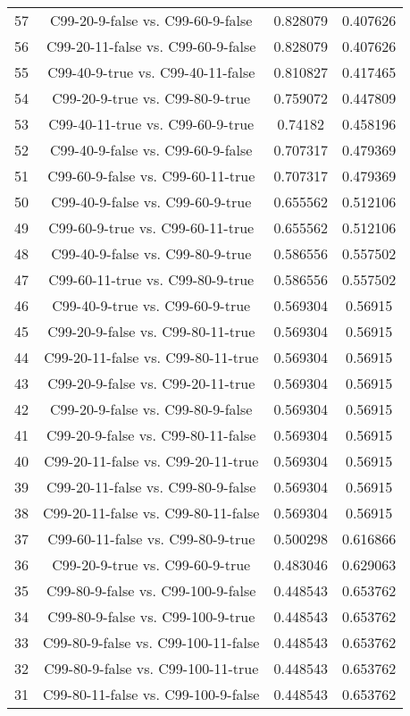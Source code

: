\documentclass[a4paper,10pt]{article}
\begin{document}
\begin{landscape}
\begin{table}[!htp]
\begin{tabular}{cccc}
57&C99-20-9-false vs. C99-60-9-false&0.828079&0.407626\\
56&C99-20-11-false vs. C99-60-9-false&0.828079&0.407626\\
55&C99-40-9-true vs. C99-40-11-false&0.810827&0.417465\\
54&C99-20-9-true vs. C99-80-9-true&0.759072&0.447809\\
53&C99-40-11-true vs. C99-60-9-true&0.74182&0.458196\\
52&C99-40-9-false vs. C99-60-9-false&0.707317&0.479369\\
51&C99-60-9-false vs. C99-60-11-true&0.707317&0.479369\\
50&C99-40-9-false vs. C99-60-9-true&0.655562&0.512106\\
49&C99-60-9-true vs. C99-60-11-true&0.655562&0.512106\\
48&C99-40-9-false vs. C99-80-9-true&0.586556&0.557502\\
47&C99-60-11-true vs. C99-80-9-true&0.586556&0.557502\\
46&C99-40-9-true vs. C99-60-9-true&0.569304&0.56915\\
45&C99-20-9-false vs. C99-80-11-true&0.569304&0.56915\\
44&C99-20-11-false vs. C99-80-11-true&0.569304&0.56915\\
43&C99-20-9-false vs. C99-20-11-true&0.569304&0.56915\\
42&C99-20-9-false vs. C99-80-9-false&0.569304&0.56915\\
41&C99-20-9-false vs. C99-80-11-false&0.569304&0.56915\\
40&C99-20-11-false vs. C99-20-11-true&0.569304&0.56915\\
39&C99-20-11-false vs. C99-80-9-false&0.569304&0.56915\\
38&C99-20-11-false vs. C99-80-11-false&0.569304&0.56915\\
37&C99-60-11-false vs. C99-80-9-true&0.500298&0.616866\\
36&C99-20-9-true vs. C99-60-9-true&0.483046&0.629063\\
35&C99-80-9-false vs. C99-100-9-false&0.448543&0.653762\\
34&C99-80-9-false vs. C99-100-9-true&0.448543&0.653762\\
33&C99-80-9-false vs. C99-100-11-false&0.448543&0.653762\\
32&C99-80-9-false vs. C99-100-11-true&0.448543&0.653762\\
31&C99-80-11-false vs. C99-100-9-false&0.448543&0.653762\\

\end{tabular}
\end{table}
\end{landscape}
\end{document}
